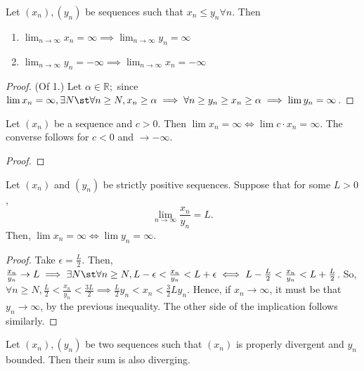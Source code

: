 \documentclass[12pt]{article}
\begin{document}
\begin{proposition}
  Let $(x_n), (y_n)$ be sequences such that $x_n \leq y_n \forall n$. Then \begin{enumerate}
    \item $\lim_{n\to\infty} x_n = \infty \implies \lim_{n\to\infty} y_n = \infty$
    \item $\lim_{n\to\infty} y_n = -\infty \implies \lim_{n\to\infty} x_n = -\infty$
  \end{enumerate}
\end{proposition}

\begin{proof}(Of 1.) Let $\alpha \in \mathbb{R};$ since $\lim x_n = \infty, \exists N \st \forall n \geq N, x_n \geq \alpha \implies \forall n \geq y_n \geq x_n \geq \alpha \implies \lim y_n = \infty$.
\end{proof}

\begin{proposition}
  Let $(x_n)$ be a sequence and $c > 0$. Then $\lim x_n = \infty \iff \lim c \cdot x_n = \infty$. The converse follows for $c < 0$ and $\to - \infty$.
\end{proposition}
\begin{proof}
\end{proof}

\begin{proposition}
  Let $(x_n)$ and $(y_n)$ be strictly positive sequences. Suppose that for some $L > 0$, \[
  \lim_{n \to\infty} \frac{x_n}{y_n} = L.
  \]
  Then, $\lim x_n = \infty \iff \lim y_n = \infty$.
\end{proposition}

\begin{proof}
  Take $\epsilon = \frac{L}{2}$. Then, $\frac{x_n}{y_n}\to L \implies \exists N \st \forall n \geq N, L - \epsilon < \frac{x_n}{y_n} < L + \epsilon \iff L - \frac{L}{2} < \frac{x_n}{y_n} < L + \frac{L}{2}$. So, $\forall n \geq N, \frac{L}{2} < \frac{x_n}{y_n} < \frac{3L}{2} \implies \frac{L}{2} y_n < x_n < \frac{3}{2} L y_n$. Hence, if $x_n \to \infty$, it must be that $y_n \to \infty$, by the previous inequality. The other side of the implication follows similarly.
\end{proof}

\begin{proposition}
  Let $(x_n), (y_n)$ be two sequences such that $(x_n)$ is properly divergent and $y_n$ bounded. Then their sum is also diverging.
\end{proposition}
\end{document}
